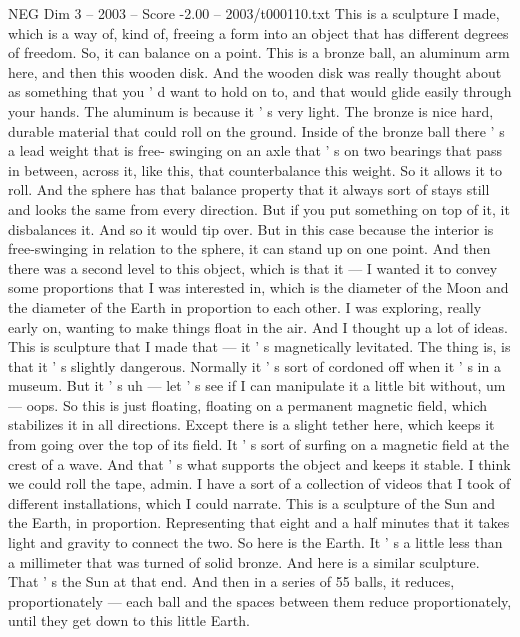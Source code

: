 \begin{textsample}{NEG Dim 3 – 2003 – Score -2.00 – 2003/t000110.txt}  \label{ex:f3_neg_011}
This is a sculpture I made, which is a way of, kind of, freeing a form into an object that has different degrees of freedom.
So, it can balance on a point.
This is a bronze ball, an aluminum arm here, and then this wooden disk.
And the wooden disk was really thought about as something that you ' d want to hold on to, and that would glide easily through your hands.
The aluminum is because it ' s very light.
The bronze is nice hard, durable material that could roll on the ground.
Inside of the bronze ball there ' s a lead weight that is free- swinging on an axle that ' s on two bearings that pass in between, across it, like this, that counterbalance this weight.
So it allows it to roll.
And the sphere has that balance property that it always sort of stays still and looks the same from every direction.
But if you put something on top of it, it disbalances it.
And so it would tip over.
But in this case because the interior is free-swinging in relation to the sphere, it can stand up on one point.
And then there was a second level to this object, which is that it — I wanted it to convey some proportions that I was interested in, which is the diameter of the Moon and the diameter of the Earth in proportion to each other.
I was exploring, really early on, wanting to make things float in the air.
And I thought up a lot of ideas.
This is sculpture that I made that — it ' s magnetically levitated.
The thing is, is that it ' s slightly dangerous.
Normally it ' s sort of cordoned off when it ' s in a museum.
But it ' s uh — let ' s see if I can manipulate it a little bit without, um — oops.
So this is just floating, floating on a permanent magnetic field, which stabilizes it in all directions.
Except there is a slight tether here, which keeps it from going over the top of its field.
It ' s sort of surfing on a magnetic field at the crest of a wave.
And that ' s what supports the object and keeps it stable.
I think we could roll the tape, admin.
I have a sort of a collection of videos that I took of different installations, which I could narrate.
This is a sculpture of the Sun and the Earth, in proportion.
Representing that eight and a half minutes that it takes light and gravity to connect the two.
So here is the Earth.
It ' s a little less than a millimeter that was turned of solid bronze.
And here is a similar sculpture.
That ' s the Sun at that end.
And then in a series of 55 balls, it reduces, proportionately — each ball and the spaces between them reduce proportionately, until they get down to this little Earth.

\end{textsample}
